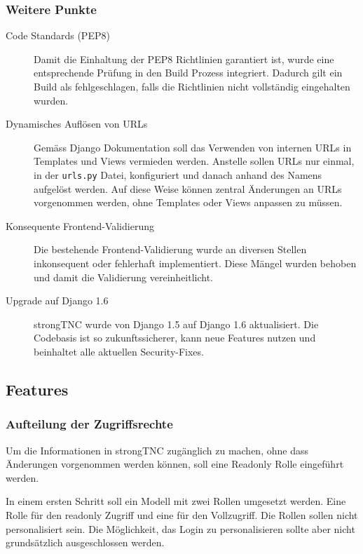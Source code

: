 \subsubsection{Weitere Punkte}
\begin{description}

\item[Code Standards (PEP8)] Damit die Einhaltung der PEP8 Richtlinien
	garantiert ist, wurde eine entsprechende Prüfung in den Build Prozess
	integriert. Dadurch gilt ein Build als fehlgeschlagen, falls die Richtlinien
	nicht vollständig eingehalten wurden.

\item[Dynamisches Auflösen von URLs] Gemäss Django Dokumentation
	soll das Verwenden von internen URLs in Templates und Views vermieden werden.
	Anstelle sollen URLs nur einmal, in der \texttt{urls.py} Datei, konfiguriert und danach anhand des Namens aufgelöst werden. Auf diese Weise können
	zentral Änderungen an URLs vorgenommen werden, ohne Templates oder Views
	anpassen zu müssen.

\item[Konsequente Frontend-Validierung] Die bestehende Frontend-Validierung
	wurde an diversen Stellen inkonsequent oder fehlerhaft implementiert. Diese Mängel
	wurden behoben und damit die Validierung vereinheitlicht.

\item[Upgrade auf Django 1.6] strongTNC wurde von Django 1.5 auf Django 1.6
	aktualisiert. Die Codebasis ist so zukunftssicherer, kann neue Features nutzen
	und beinhaltet alle aktuellen Security-Fixes.

\end{description}

\subsection{Features}

\subsubsection{Aufteilung der Zugriffsrechte}
Um die Informationen in strongTNC zugänglich zu machen,
ohne dass Änderungen vorgenommen werden können, soll eine Readonly Rolle eingeführt werden.

In einem ersten Schritt soll ein Modell mit zwei Rollen umgesetzt werden. Eine
Rolle für den readonly Zugriff und eine für den Vollzugriff. Die Rollen sollen nicht personalisiert sein. Die Möglichkeit, das Login zu personalisieren sollte aber nicht grundsätzlich ausgeschlossen werden.

